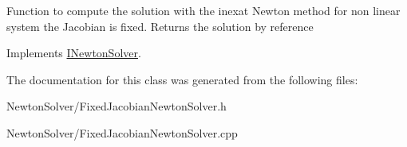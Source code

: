 Function to compute the solution with the inexat Newton method for non linear system the Jacobian is fixed. Returns the solution by reference 

Implements \hyperlink{classINewtonSolver_aaf2a0a6fbf03d4f58ba24e47590458d0}{INewtonSolver}.

The documentation for this class was generated from the following files:\begin{DoxyCompactItemize}
\item 
NewtonSolver/FixedJacobianNewtonSolver.h\item 
NewtonSolver/FixedJacobianNewtonSolver.cpp\end{DoxyCompactItemize}
